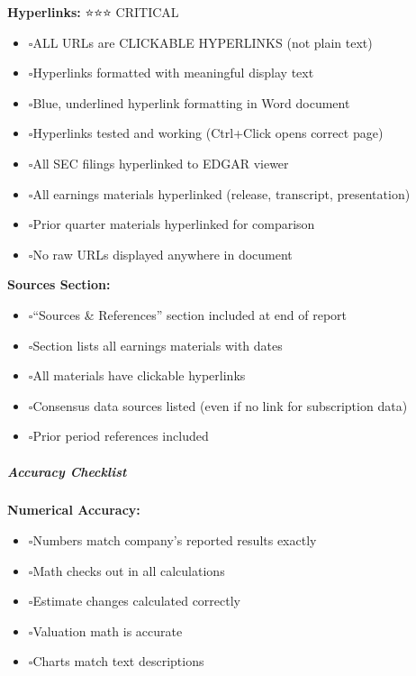 \documentclass[11pt]{article}
\newcommand{\UncheckedBox}{$\square$}
\begin{document}
\textbf{Hyperlinks:} ⭐⭐⭐ CRITICAL

\begin{itemize}[leftmargin=*,itemsep=2pt,topsep=2pt]
\item {} \UncheckedBox ALL URLs are CLICKABLE HYPERLINKS (not plain text)
\item {} \UncheckedBox Hyperlinks formatted with meaningful display text
\item {} \UncheckedBox Blue, underlined hyperlink formatting in Word document
\item {} \UncheckedBox Hyperlinks tested and working (Ctrl+Click opens correct page)
\item {} \UncheckedBox All SEC filings hyperlinked to EDGAR viewer
\item {} \UncheckedBox All earnings materials hyperlinked (release, transcript, presentation)
\item {} \UncheckedBox Prior quarter materials hyperlinked for comparison
\item {} \UncheckedBox No raw URLs displayed anywhere in document
\end{itemize}

\textbf{Sources Section:}

\begin{itemize}[leftmargin=*,itemsep=2pt,topsep=2pt]
\item {} \UncheckedBox ``Sources \& References'' section included at end of report
\item {} \UncheckedBox Section lists all earnings materials with dates
\item {} \UncheckedBox All materials have clickable hyperlinks
\item {} \UncheckedBox Consensus data sources listed (even if no link for subscription data)
\item {} \UncheckedBox Prior period references included
\end{itemize}

\subparagraph{Accuracy Checklist}\mbox{}\par

\textbf{Numerical Accuracy:}

\begin{itemize}[leftmargin=*,itemsep=2pt,topsep=2pt]
\item {} \UncheckedBox Numbers match company's reported results exactly
\item {} \UncheckedBox Math checks out in all calculations
\item {} \UncheckedBox Estimate changes calculated correctly
\item {} \UncheckedBox Valuation math is accurate
\item {} \UncheckedBox Charts match text descriptions
\end{itemize}
\end{document}
